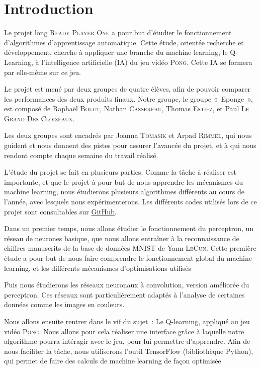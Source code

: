 \section*{Introduction}

Le projet long \textsc{Ready Player One} a pour but d’étudier le fonctionnement d’algorithmes d'apprentissage automatique. Cette étude, 
orientée recherche et développement, cherche à appliquer une branche du machine learning, le Q-Learning, à l’intelligence artificielle (IA)
du jeu vidéo \textsc{Pong}. Cette IA se formera par elle-même sur ce jeu.

Le projet est mené par deux groupes de quatre élèves, afin de pouvoir comparer les performances des deux produits finaux. 
Notre groupe, le groupe « Eponge », est composé de Raphaël \textsc{Bolut}, Nathan \textsc{Cassereau}, Thomas \textsc{Estiez}, et 
Paul \textsc{Le Grand Des Cloizeaux}. 

Les deux groupes sont encadrés par Joanna \textsc{Tomasik} et Arpad \textsc{Rimmel}, qui nous guident et nous donnent des pistes
pour assurer l'avancée du projet, et à qui nous rendont compte chaque semaine du travail réalisé.

L’étude du projet se fait en plusieurs parties. Comme la tâche à réaliser est importante, et que le projet à pour but 
de nous apprendre les mécanismes du machine learning, nous étudierons plusieurs algorithmes différents au cours de l’année, avec lesquels nous expérimenterons. 
Les différents codes utilisés lors de ce projet sont consultables sur \href{https://github.com/ready-player-one-supelec}{GitHub}.

Dans un premier temps, nous allons étudier le fonctionnement du perceptron, un réseau de neurones basique, que nous allons entraîner 
à la reconnaissance de chiffres manuscrits de la base de données MNIST de Yann \textsc{LeCun}. Cette première étude a pour but de nous faire 
comprendre le fonctionnement global du machine learning, et les différents mécanismes d’optimisations utilisés
 
Puis nous étudierons les réseaux neuronaux à convolution, version améliorée du perceptron. Ces réseaux sont particulièrement adaptés à l'analyse
de certaines données comme les images en couleurs.

Nous allons ensuite rentrer dans le vif du sujet : Le Q-learning, appliqué au jeu vidéo \textsc{Pong}. Nous allons pour cela réaliser une 
interface grâce à laquelle notre algorithme pourra intéragir avec le jeu, pour lui permettre d’apprendre. Afin de nous faciliter la tâche, nous 
utiliserons l’outil TensorFlow (bibliothèque Python), qui permet de faire des calculs de machine learning de façon optimisée
